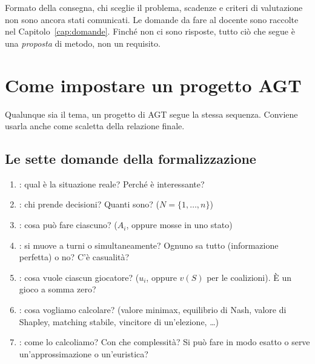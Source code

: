 \documentclass[11pt, a4paper, oneside, openany]{book}
\begin{document}
\begin{attenzione}
Formato della consegna, chi sceglie il problema, scadenze e
criteri di valutazione non sono ancora stati comunicati. Le domande da fare al docente sono
raccolte nel Capitolo~\ref{cap:domande}. Finché non ci sono risposte, tutto ciò che segue è
una \emph{proposta} di metodo, non un requisito.
\end{attenzione}

\chapter{Come impostare un progetto AGT}
\label{cap:metodo}

Qualunque sia il tema, un progetto di AGT segue la stessa sequenza. Conviene usarla anche
come scaletta della relazione finale.

\section{Le sette domande della formalizzazione}

\begin{enumerate}[label=\textbf{\arabic*.}, leftmargin=2em]
  \item {}: qual è la situazione reale? Perché è interessante?
  \item {}: chi prende decisioni? Quanti sono? ($N = \{1,\dots,n\}$)
  \item {}: cosa può fare ciascuno? ($A_i$, oppure mosse in uno stato)
  \item {}: si muove a turni o simultaneamente? Ognuno sa tutto
        (informazione perfetta) o no? C'è casualità?
  \item {}: cosa vuole ciascun giocatore? ($u_i$, oppure $v(S)$ per le coalizioni).
        È un gioco a somma zero?
  \item {}: cosa vogliamo calcolare? (valore minimax, equilibrio di
        Nash, valore di Shapley, matching stabile, vincitore di un'elezione, \ldots)
  \item {}: come lo calcoliamo? Con che complessità? Si può fare in modo esatto
        o serve un'approssimazione o un'euristica?
\end{enumerate}
\end{document}
